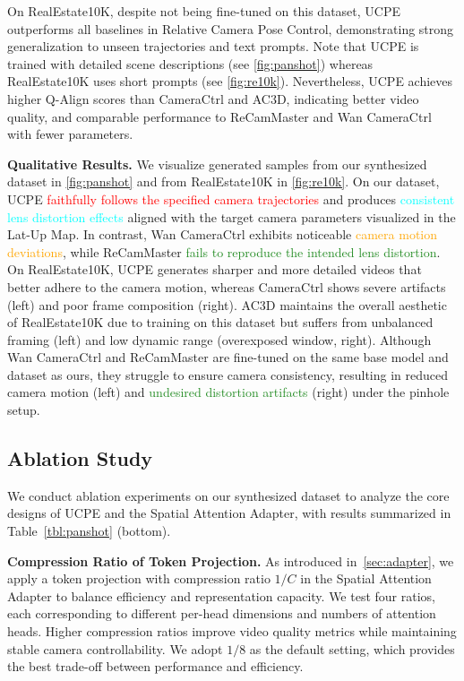 On RealEstate10K, despite not being fine-tuned on this dataset, UCPE outperforms all baselines in Relative Camera Pose Control, demonstrating strong generalization to unseen trajectories and text prompts.
Note that UCPE is trained with detailed scene descriptions (see \cref{fig:panshot}) whereas RealEstate10K uses short prompts (see \cref{fig:re10k}).
Nevertheless, UCPE achieves higher Q-Align scores than CameraCtrl and AC3D, indicating better video quality, and comparable performance to ReCamMaster and Wan CameraCtrl with fewer parameters.


\noindent\textbf{Qualitative Results.}
We visualize generated samples from our synthesized dataset in \cref{fig:panshot} and from RealEstate10K in \cref{fig:re10k}.
On our dataset, UCPE \textcolor{red}{faithfully follows the specified camera trajectories} and produces \textcolor{cyan}{consistent lens distortion effects} aligned with the target camera parameters visualized in the Lat-Up Map.
In contrast, Wan CameraCtrl exhibits noticeable \textcolor{orange}{camera motion deviations}, while ReCamMaster \textcolor{ForestGreen}{fails to reproduce the intended lens distortion}.
On RealEstate10K, UCPE generates sharper and more detailed videos that better adhere to the camera motion, whereas CameraCtrl shows severe artifacts (left) and poor frame composition (right).
AC3D maintains the overall aesthetic of RealEstate10K due to training on this dataset but suffers from unbalanced framing (left) and low dynamic range (overexposed window, right).
Although Wan CameraCtrl and ReCamMaster are fine-tuned on the same base model and dataset as ours, they struggle to ensure camera consistency, resulting in reduced camera motion (left) and \textcolor{ForestGreen}{undesired distortion artifacts} (right) under the pinhole setup.

\subsection{Ablation Study}

We conduct ablation experiments on our synthesized dataset to analyze the core designs %
of UCPE and the Spatial Attention Adapter, with results summarized in %
Table~\ref{tbl:panshot} (bottom).

\noindent\textbf{Compression Ratio of Token Projection.}
As introduced in~\cref{sec:adapter}, we apply a token projection with compression ratio \(1/C\) in the Spatial Attention Adapter to balance efficiency and representation capacity.
We test four ratios, each corresponding to different per-head dimensions and numbers of attention heads.
Higher compression ratios improve video quality metrics while maintaining stable camera controllability.
We adopt \(1/8\) as the default setting, which provides the best trade-off between performance and efficiency.

